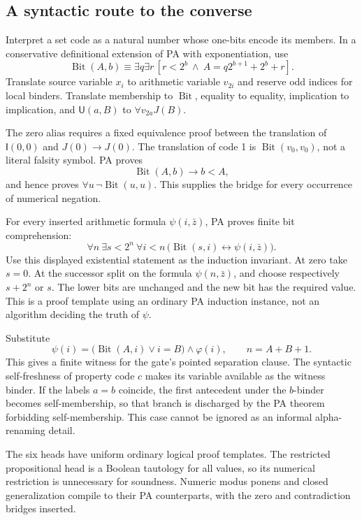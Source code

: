 \documentclass[11pt,a4paper]{article}
\newcommand{\UU}{\mathsf{U}}
\newcommand{\II}{\mathsf{I}}
\newcommand{\Bit}{\operatorname{Bit}}
\begin{document}
\subsection{A syntactic route to the converse}

Interpret a set code as a natural number whose one-bits encode its members. In a conservative definitional extension of PA with exponentiation, use
\[
\Bit(A,b)\equiv\exists q\exists r\,
[r<2^b\ \wedge\ A=q2^{b+1}+2^b+r].
\]
Translate source variable $x_i$ to arithmetic variable $v_{2i}$ and reserve odd indices for local binders. Translate membership to $\Bit$, equality to equality, implication to implication, and $\UU(a,B)$ to $\forall v_{2a}J(B)$.

The zero alias requires a fixed equivalence proof between the translation of $\II(0,0)$ and $J(0)\to J(0)$. The translation of code 1 is $\Bit(v_0,v_0)$, not a literal falsity symbol. PA proves
\[
\Bit(A,b)\to b<A,
\]
and hence proves $\forall u\,\neg\Bit(u,u)$. This supplies the bridge for every occurrence of numerical negation.

For every inserted arithmetic formula $\psi(i,\bar z)$, PA proves finite bit comprehension:
\[
\forall n\ \exists s<2^n\ \forall i<n\,
\bigl(\Bit(s,i)\leftrightarrow\psi(i,\bar z)\bigr).\tag{FC}
\]
Use this displayed existential statement as the induction invariant. At zero take $s=0$. At the successor split on the formula $\psi(n,\bar z)$, and choose respectively $s+2^n$ or $s$. The lower bits are unchanged and the new bit has the required value. This is a proof template using an ordinary PA induction instance, not an algorithm deciding the truth of $\psi$.

Substitute
\[
\psi(i)=\bigl(\Bit(A,i)\lor i=B\bigr)\wedge\varphi(i),
\qquad n=A+B+1.
\]
This gives a finite witness for the gate's pointed separation clause. The syntactic self-freshness of property code $c$ makes its variable available as the witness binder. If the labels $a=b$ coincide, the first antecedent under the $b$-binder becomes self-membership, so that branch is discharged by the PA theorem forbidding self-membership. This case cannot be ignored as an informal alpha-renaming detail.

The six heads have uniform ordinary logical proof templates. The restricted propositional head is a Boolean tautology for all values, so its numerical restriction is unnecessary for soundness. Numeric modus ponens and closed generalization compile to their PA counterparts, with the zero and contradiction bridges inserted.
\end{document}
